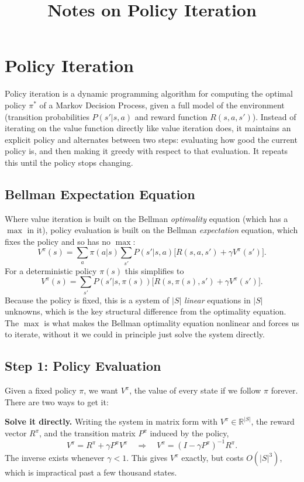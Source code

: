\documentclass[conference]{IEEEtran}
\title{Notes on Policy Iteration}
\author{
\IEEEauthorblockN{Luis Mendez}
}
\begin{document}
\maketitle

\section*{Policy Iteration}
Policy iteration is a dynamic programming algorithm for computing the optimal policy $\pi^*$ of a Markov Decision Process, given a full model of the environment (transition probabilities $P(s'|s,a)$ and reward function $R(s,a,s')$). Instead of iterating on the value function directly like value iteration does, it maintains an explicit policy and alternates between two steps: evaluating how good the current policy is, and then making it greedy with respect to that evaluation. It repeats this until the policy stops changing.

\subsection*{Bellman Expectation Equation}
Where value iteration is built on the Bellman \emph{optimality} equation (which has a $\max$ in it), policy evaluation is built on the Bellman \emph{expectation} equation, which fixes the policy and so has no $\max$:
\[
    V^\pi(s) = \sum_{a} \pi(a|s) \sum_{s'} P(s'|s,a)\big[R(s,a,s') + \gamma V^\pi(s')\big].
\]
For a deterministic policy $\pi(s)$ this simplifies to
\[
    V^\pi(s) = \sum_{s'} P(s'|s,\pi(s))\big[R(s,\pi(s),s') + \gamma V^\pi(s')\big].
\]
Because the policy is fixed, this is a system of $|S|$ \emph{linear} equations in $|S|$ unknowns, which is the key structural difference from the optimality equation. The $\max$ is what makes the Bellman optimality equation nonlinear and forces us to iterate, without it we could in principle just solve the system directly.

\subsection*{Step 1: Policy Evaluation}
Given a fixed policy $\pi$, we want $V^\pi$, the value of every state if we follow $\pi$ forever. There are two ways to get it:

\textbf{Solve it directly.} Writing the system in matrix form with $V^\pi \in \mathbb{R}^{|S|}$, the reward vector $R^\pi$, and the transition matrix $P^\pi$ induced by the policy,
\[
    V^\pi = R^\pi + \gamma P^\pi V^\pi \quad \Longrightarrow \quad V^\pi = (I - \gamma P^\pi)^{-1} R^\pi.
\]
The inverse exists whenever $\gamma < 1$. This gives $V^\pi$ exactly, but costs $O(|S|^3)$, which is impractical past a few thousand states.
\end{document}
